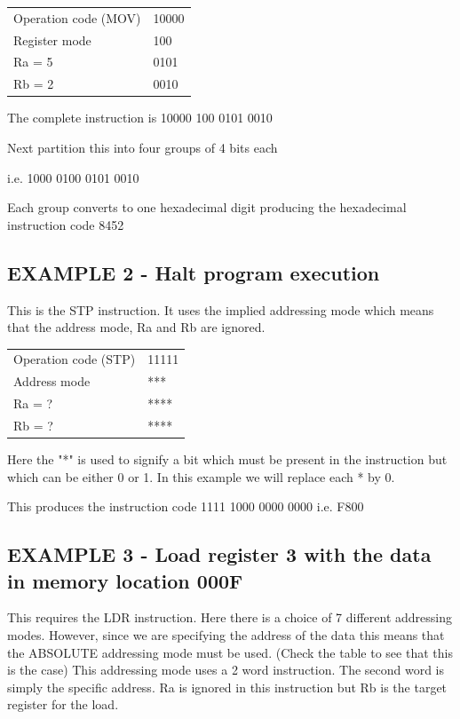 \documentclass{article}
\begin{document}
\begin{tabular}{ m{4cm} m{1cm} }
    Operation code (MOV) & 10000 \\ 
    Register mode & 100 \\  
    Ra = 5 & 0101 \\
    Rb = 2 & 0010
\end{tabular}

The complete instruction is 10000 100 0101 0010

Next partition this into four groups of 4 bits each

\qquad i.e. 1000 0100 0101 0010

Each group converts to one hexadecimal digit producing the hexadecimal instruction code 8452

\subsection{EXAMPLE 2 - Halt program execution}

This is the STP instruction. It uses the implied addressing mode which means that the address mode, Ra and Rb are ignored.

\begin{tabular}{ m{4cm} m{1cm} }
    Operation code (STP) & 11111 \\ 
    Address mode & *** \\  
    Ra = ? & **** \\
    Rb = ? & ****
\end{tabular}

Here the "*" is used to signify a bit which must be present in the instruction but which can be either 0 or 1. In this example we will replace each * by 0.

This produces the instruction code 1111 1000 0000 0000 i.e. F800

\subsection{EXAMPLE 3 - Load register 3 with the data in memory location 000F}

This requires the LDR instruction. Here there is a choice of 7 different addressing modes. However, since we are specifying the address of the data this means that the ABSOLUTE addressing mode must be used. (Check the table to see that this is the case) This addressing mode uses a 2 word instruction. The second word is simply the specific address. Ra is ignored in this instruction but Rb is the target register for the load.
\end{document}
